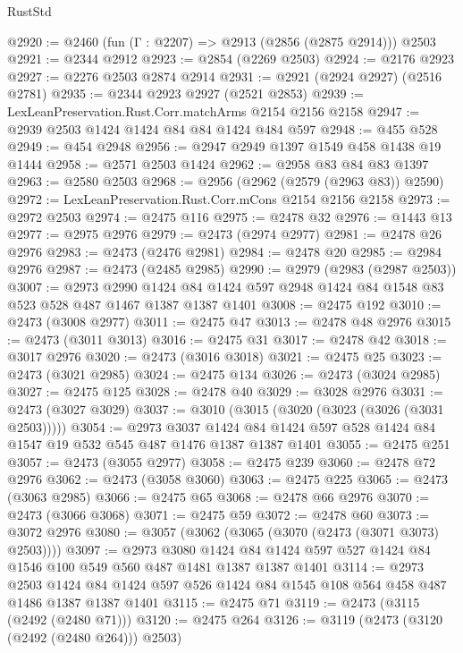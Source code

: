 \begin{lexlean}{RustStd}
\begin{coremodule}
@2920 := @2460 (fun (Γ : @2207) => @2913 (@2856 (@2875 @2914))) @2503
@2921 := @2344 @2912
@2923 := @2854 (@2269 @2503)
@2924 := @2176 @2923
@2927 := @2276 @2503 @2874 @2914
@2931 := @2921 (@2924 @2927) (@2516 @2781)
@2935 := @2344 @2923 @2927 (@2521 @2853)
@2939 := LexLeanPreservation.Rust.Corr.matchArms @2154 @2156 @2158
@2947 := @2939 @2503 @1424 @1424 @84 @84 @1424 @484 @597
@2948 := @455 @528
@2949 := @454 @2948
@2956 := @2947 @2949 @1397 @1549 @458 @1438 @19 @1444
@2958 := @2571 @2503 @1424
@2962 := @2958 @83 @84 @83 @1397
@2963 := @2580 @2503
@2968 := @2956 (@2962 (@2579 (@2963 @83)) @2590)
@2972 := LexLeanPreservation.Rust.Corr.mCons @2154 @2156 @2158
@2973 := @2972 @2503
@2974 := @2475 @116
@2975 := @2478 @32
@2976 := @1443 @13
@2977 := @2975 @2976
@2979 := @2473 (@2974 @2977)
@2981 := @2478 @26 @2976
@2983 := @2473 (@2476 @2981)
@2984 := @2478 @20
@2985 := @2984 @2976
@2987 := @2473 (@2485 @2985)
@2990 := @2979 (@2983 (@2987 @2503))
@3007 := @2973
    @2990
    @1424
    @84
    @1424
    @597
    @2948
    @1424
    @84
    @1548
    @83
    @523
    @528
    @487
    @1467
    @1387
    @1387
    @1401
@3008 := @2475 @192
@3010 := @2473 (@3008 @2977)
@3011 := @2475 @47
@3013 := @2478 @48 @2976
@3015 := @2473 (@3011 @3013)
@3016 := @2475 @31
@3017 := @2478 @42
@3018 := @3017 @2976
@3020 := @2473 (@3016 @3018)
@3021 := @2475 @25
@3023 := @2473 (@3021 @2985)
@3024 := @2475 @134
@3026 := @2473 (@3024 @2985)
@3027 := @2475 @125
@3028 := @2478 @40
@3029 := @3028 @2976
@3031 := @2473 (@3027 @3029)
@3037 := @3010 (@3015 (@3020 (@3023 (@3026 (@3031 @2503)))))
@3054 := @2973
    @3037
    @1424
    @84
    @1424
    @597
    @528
    @1424
    @84
    @1547
    @19
    @532
    @545
    @487
    @1476
    @1387
    @1387
    @1401
@3055 := @2475 @251
@3057 := @2473 (@3055 @2977)
@3058 := @2475 @239
@3060 := @2478 @72 @2976
@3062 := @2473 (@3058 @3060)
@3063 := @2475 @225
@3065 := @2473 (@3063 @2985)
@3066 := @2475 @65
@3068 := @2478 @66 @2976
@3070 := @2473 (@3066 @3068)
@3071 := @2475 @59
@3072 := @2478 @60
@3073 := @3072 @2976
@3080 := @3057 (@3062 (@3065 (@3070 (@2473 (@3071 @3073) @2503))))
@3097 := @2973
    @3080
    @1424
    @84
    @1424
    @597
    @527
    @1424
    @84
    @1546
    @100
    @549
    @560
    @487
    @1481
    @1387
    @1387
    @1401
@3114 := @2973
    @2503
    @1424
    @84
    @1424
    @597
    @526
    @1424
    @84
    @1545
    @108
    @564
    @458
    @487
    @1486
    @1387
    @1387
    @1401
@3115 := @2475 @71
@3119 := @2473 (@3115 (@2492 (@2480 @71)))
@3120 := @2475 @264
@3126 := @3119 (@2473 (@3120 (@2492 (@2480 @264))) @2503)

\end{coremodule}
\end{lexlean}
